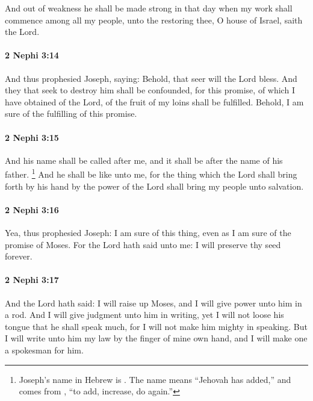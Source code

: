			And out of weakness he shall be made strong in that day
			when my work shall commence among all my people,
			unto the restoring thee, O house of Israel, saith the Lord.

		\paragraph{2 Nephi 3:14} %
			\label{2NEPHI-3-14}

			And thus prophesied Joseph, saying:
			Behold, that seer will the Lord bless.
			And they that seek to destroy him shall be confounded,
			for this promise, of which I have obtained of the Lord,
			of the fruit of my loins shall be fulfilled.
			Behold, I am sure of the fulfilling of this promise.

		\paragraph{2 Nephi 3:15} %
			\label{2NEPHI-3-15}

			And his name shall be called after me,
			and it shall be after the name of his father.%
				\footnote{%
					\label{2NEPHI-3-15-name}%
					Joseph's name in Hebrew is . The name means ``Jehovah has added,'' and comes from , ``to add, increase, do again.''
					}
			And he shall be like unto me,
			for the thing which the Lord shall bring forth by his hand
			by the power of the Lord
			shall bring my people unto salvation.

		\paragraph{2 Nephi 3:16} %
			\label{2NEPHI-3-16}

			Yea, thus prophesied Joseph:
			I am sure of this thing,
			even as I am sure of the promise of Moses.
			For the Lord hath said unto me:
			I will preserve thy seed forever.

		\paragraph{2 Nephi 3:17} %
			\label{2NEPHI-3-17}

			And the Lord hath said:
			I will raise up Moses,
			and I will give power unto him in a rod.
			And I will give judgment unto him in writing,
			yet I will not loose his tongue that he shall speak much,
			for I will not make him mighty in speaking.
			But I will write unto him my law by the finger of mine own hand,
			and I will make one a spokesman for him.

